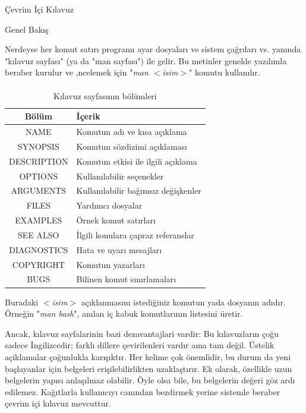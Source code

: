 \begin{section}{Çevrim İçi Kılavuz}
\begin{subsection}{Genel Bakış}

Nerdeyse her komut satırı programı ayar dosyaları ve sistem çağrıları vs. yanında "kılavuz sayfası" (ya da "man sayfası") ile gelir. Bu metinler genelde yazılımla beraber kurulur ve ,ncelemek için "\emph{man $<$isim$>$}" komutu kullanılır.

\paragraph{}{
\begin {table}[H]
\caption {Kılavuz sayfasının bölümleri} \label{tab:tablo51} 
\begin{tabular}{c l}
\hline
Bölüm & İçerik \\
\hline
NAME 	&	Komutun adı ve kısa açıklama \\
SYNOPSIS &	Komutun sözdizimi açıklaması \\
DESCRIPTION &	Komutun etkisi ile ilgili açıklama \\
OPTIONS &	Kullanılabilir seçenekler \\
ARGUMENTS &	Kullanılabilir bağımsız değişkenler \\
FILES 	&	Yardımcı dosyalar \\
EXAMPLES &	Örnek komut satırları \\
SEE ALSO &	İlgili konulara çapraz referanslar \\
DIAGNOSTICS &	Hata ve uyarı mesajları \\
COPYRIGHT & 	Komutun yazarları \\
BUGS	&	Bilinen komut sınırlamaları \\
\hline
\end{tabular}
\end {table}
}

Buradaki \emph{$<$isim$>$} açıklanmasını istediğiniz komutun yada dosyanın adıdır. Örneğin "\emph{man bash}", anılan iç kabuk komutlarının listesini üretir.

Ancak, kılavuz sayfalarinin bazi dezavantajlari vardir: Bu kılavuzların çoğu sadece İngilizcedir; farklı dillere çevirilenleri vardır ama tam değil. Üstelik açiklamalar çoğunlukla karışıktır. Her kelime çok önemlidir, bu durum da yeni başlayanlar için belgeleri erişilebilirlikten uzaklaştırır. Ek olarak, özellikle uzun belgelerin yapısı anlaşılmaz olabilir. Öyle olsa bile, bu belgelerin değeri göz ardı edilemez. Kağıtlarla kullanıcıyı canından bezdirmek yerine sistemle beraber çevrim içi kılavuz mevcuttur.


\end{subsection}
\end{section}
